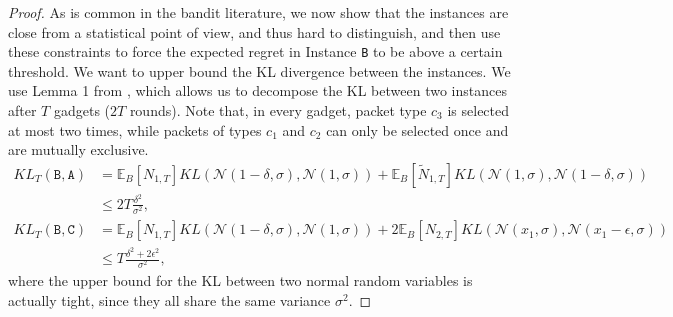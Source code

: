 \begin{proof}
    As is common in the bandit literature, we now show that the instances are close from a statistical point of view, and thus hard to distinguish, and then use these constraints to force the expected regret in Instance \texttt{B} to be above a certain threshold. We want to upper bound the KL divergence between the instances. We use Lemma 1 from \cite{gerchinovitz2016refined}, which allows us to decompose the KL between two instances after $T$ gadgets ($2T$ rounds). Note that, in every gadget, packet type $c_3$ is selected at most two times, while packets of types $c_1$ and $c_2$ can only be selected once and are mutually exclusive.
    \begin{align*}
        KL_T(\texttt{B},\texttt{A}) &= \mathbb{E}_B[N_{1,T}]KL\left(\mathcal{N}(1-\delta,\sigma), \mathcal{N}(1,\sigma)\right) + \mathbb{E}_B[\widetilde{N}_{1,T}]KL\left(\mathcal{N}(1,\sigma), \mathcal{N}(1-\delta,\sigma)\right) \\
        &\le 2T\frac{\delta^2}{\sigma^2},\\
        KL_T(\texttt{B},\texttt{C}) &= \mathbb{E}_B[N_{1,T}]KL\left(\mathcal{N}(1-\delta,\sigma), \mathcal{N}(1,\sigma)\right) + 2\mathbb{E}_B[{N}_{2,T}]KL\left(\mathcal{N}(x_1,\sigma), \mathcal{N}(x_1-\epsilon,\sigma)\right) \\
        &\le T\frac{\delta^2+2\epsilon^2}{\sigma^2},
    \end{align*}
    where the upper bound for the KL between two normal random variables is actually tight, since they all share the same variance $\sigma^2$.


\end{proof}
